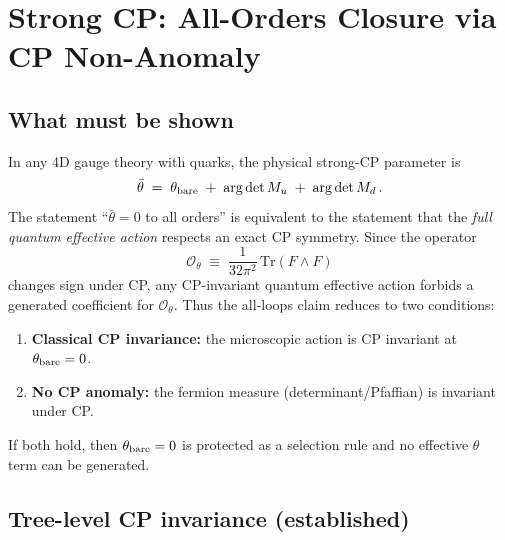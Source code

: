 
\section{Strong CP: All-Orders Closure via CP Non-Anomaly}\label{app:strongcp_selection_rule}

\subsection{What must be shown}

In any 4D gauge theory with quarks, the physical strong-CP parameter is
\begin{equation}
\bar\theta\;=\;\theta_{\rm bare}\;+\;\arg\det M_u\;+\;\arg\det M_d\,.
\label{eq:L_theta_bar}
\end{equation}
The statement ``$\bar\theta=0$ to all orders'' is equivalent to the statement that the \emph{full quantum effective action} respects an exact CP symmetry.
Since the operator
\begin{equation}
\mathcal{O}_\theta\;\equiv\;\frac{1}{32\pi^2}\,\mathrm{Tr}(F\wedge F)
\end{equation}
changes sign under CP, any CP-invariant quantum effective action forbids a generated coefficient for $\mathcal{O}_\theta$.
Thus the all-loops claim reduces to two conditions:
\begin{enumerate}
\item \textbf{Classical CP invariance:} the microscopic action is CP invariant at $\theta_{\rm bare}=0$.
\item \textbf{No CP anomaly:} the fermion measure (determinant/Pfaffian) is invariant under CP.
\end{enumerate}
If both hold, then $\theta_{\rm bare}=0$ is protected as a selection rule and no effective $\theta$ term can be generated.

\subsection{Tree-level CP invariance (established)}

